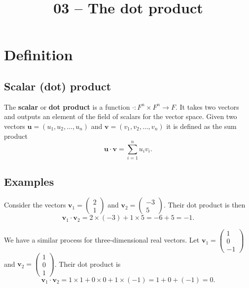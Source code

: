\documentclass[a4paper,12pt]{amsart}
\title{03 -- The dot product}
\begin{document}
    

    \maketitle
    \tableofcontents

    \section{Definition}

    \subsection{Scalar (dot) product}

    The \textbf{scalar} or \textbf{dot product} is a function $\cdot: F^n \times F^n \to F$. It takes two vectors and outputs an element of the field of scalars for the vector space. Given two vectors $\mathbf{u} = (u_1, u_2, \ldots, u_n)$ and $\mathbf{v} = (v_1, v_2, \ldots, v_n)$ it is defined as the sum product 
    \[ \mathbf{u} \cdot \mathbf{v} = \sum_{i=1}^n u_i v_i. \]

    \subsection{Examples}

    Consider the vectors $\mathbf{v}_1 = \begin{pmatrix} 2 \\ 1 \end{pmatrix}$ and $\mathbf{v}_2 = \begin{pmatrix} -3 \\ 5 \end{pmatrix}$. Their dot product is then
    \[ \mathbf{v}_1 \cdot \mathbf{v}_2 = 2 \times (-3) + 1 \times 5 = -6 + 5 = -1. \]

    We have a similar process for three-dimensional real vectors. Let $\mathbf{v}_1 = \begin{pmatrix} 1 \\ 0 \\ -1 \end{pmatrix}$ and $\mathbf{v}_2 = \begin{pmatrix} 1 \\ 0 \\ 1 \end{pmatrix}$. Their dot product is
    \[ \mathbf{v}_1 \cdot \mathbf{v}_2 = 1 \times 1 + 0 \times 0 + 1 \times (-1) = 1 + 0 + (-1) = 0. \]
\end{document}
